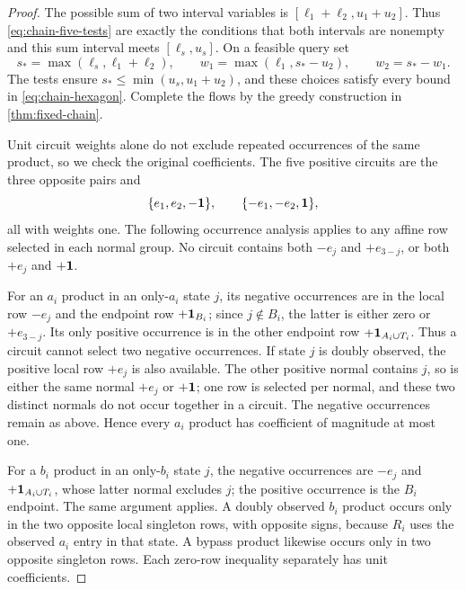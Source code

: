 \begin{proof}
The possible sum of two interval variables is
$[\ell_1+\ell_2,u_1+u_2]$. Thus \eqref{eq:chain-five-tests}
are exactly the conditions that both intervals are nonempty and
this sum interval meets $[\ell_s,u_s]$. On a feasible query set
\[
 s_* =\max(\ell_s,\ell_1+\ell_2),\qquad
 w_1=\max(\ell_1,s_*-u_2),\qquad w_2=s_*-w_1.
\]
The tests ensure $s_*\le\min(u_s,u_1+u_2)$, and these choices
satisfy every bound in \eqref{eq:chain-hexagon}. Complete the
flows by the greedy construction in \cref{thm:fixed-chain}.

Unit circuit weights alone do not exclude repeated occurrences of the
same product, so we check the original coefficients. The five
positive circuits are the three opposite pairs and
\begin{equation}\label{eq:chain-five-circuits}
 \{e_1,e_2,-\mathbf 1\},\qquad
 \{-e_1,-e_2,\mathbf 1\},
\end{equation}
all with weights one. The following occurrence analysis applies to
any affine row selected in each normal group. No circuit contains
both $-e_j$ and $+e_{3-j}$, or both $+e_j$ and $+\mathbf 1$.

For an $a_i$ product in an only-$a_i$ state $j$, its negative
occurrences are in the local row $-e_j$ and the endpoint row
$+\mathbf 1_{B_i}$; since $j\notin B_i$, the latter is either zero
or $+e_{3-j}$. Its only positive occurrence is in the other endpoint
row $+\mathbf 1_{A_i\cup T_i}$. Thus a circuit cannot select two
negative occurrences. If state $j$ is doubly observed, the positive
local row $+e_j$ is also available. The other positive normal
contains $j$, so is either the same normal $+e_j$ or $+\mathbf 1$;
one row is selected per normal, and these two distinct normals do
not occur together in a circuit. The negative occurrences remain
as above. Hence every $a_i$ product has coefficient of magnitude
at most one.

For a $b_i$ product in an only-$b_i$ state $j$, the negative
occurrences are $-e_j$ and $+\mathbf 1_{A_i\cup T_i}$, whose latter
normal excludes $j$; the positive occurrence is the $B_i$ endpoint.
The same argument applies. A doubly observed $b_i$ product occurs
only in the two opposite local singleton rows, with opposite signs,
because $R_i$ uses the observed $a_i$ entry in that state.
A bypass product likewise occurs only in two opposite singleton rows.
Each zero-row inequality separately has unit coefficients.


\end{proof}
